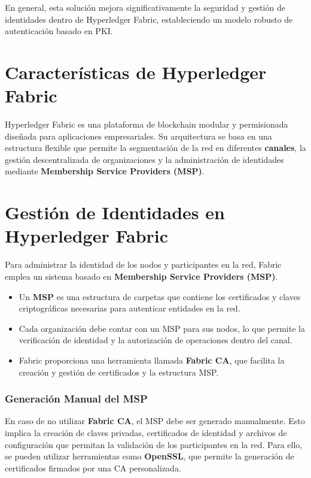 En general, esta solución mejora significativamente la seguridad y gestión de identidades dentro de Hyperledger Fabric, estableciendo un modelo robusto de autenticación basado en PKI.
\section{Características de Hyperledger Fabric}
Hyperledger Fabric\cite{hyperledgerfabric} es una plataforma de blockchain modular y permisionada diseñada para aplicaciones empresariales. Su arquitectura se basa en una estructura flexible que permite la segmentación de la red en diferentes \textbf{canales}, la gestión descentralizada de organizaciones y la administración de identidades mediante \textbf{Membership Service Providers (MSP)}.


\section{Gestión de Identidades en Hyperledger Fabric}

Para administrar la identidad de los nodos y participantes en la red, Fabric emplea un sistema basado en \textbf{Membership Service Providers (MSP)}\cite{hyperledgerfabric}.

\begin{itemize}
    \item Un \textbf{MSP} es una estructura de carpetas que contiene los certificados y claves criptográficas necesarias para autenticar entidades en la red.
    \item Cada organización debe contar con un MSP para sus nodos, lo que permite la verificación de identidad y la autorización de operaciones dentro del canal.
    \item Fabric proporciona una herramienta llamada \textbf{Fabric CA}, que facilita la creación y gestión de certificados y la estructura MSP.
\end{itemize}

\subsubsection{Generación Manual del MSP}

En caso de no utilizar \textbf{Fabric CA}, el MSP debe ser generado manualmente. Esto implica la creación de claves privadas, certificados de identidad y archivos de configuración que permitan la validación de los participantes en la red. Para ello, se pueden utilizar herramientas como \textbf{OpenSSL}\cite{openssl}, que permite la generación de certificados firmados por una CA personalizada.

